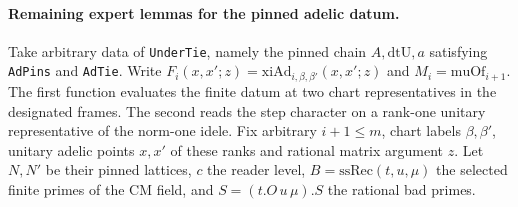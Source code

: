 \paragraph{Remaining expert lemmas for the pinned adelic datum.}
Take arbitrary data of \nolinkurl{UnderTie}, namely the pinned chain \(A,\mathrm{dtU},a\) satisfying \nolinkurl{AdPins} and \nolinkurl{AdTie}. Write \(F_i(x,x';z)=\mathrm{xiAd}_{i,\beta,\beta'}(x,x';z)\) and \(M_i=\mathrm{muOf}_{i+1}\). The first function evaluates the finite datum at two chart representatives in the designated frames. The second reads the step character on a rank-one unitary representative of the norm-one idele. Fix arbitrary \(i+1\le m\), chart labels \(\beta,\beta'\), unitary adelic points \(x,x'\) of these ranks and rational matrix argument \(z\). Let \(N,N'\) be their pinned lattices, \(c\) the reader level, \(B=\mathrm{ssRec}(t,u,\mu)\) the selected finite primes of the CM field, and \(S=(t.O\,u\,\mu).S\) the rational bad primes.
